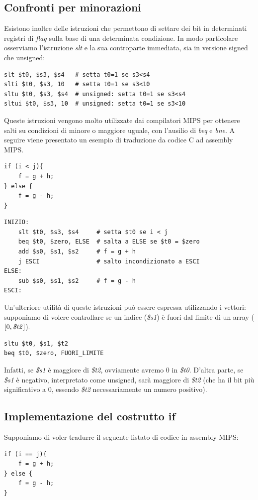 \documentclass[class=book, crop=false]{standalone}
\begin{document}
\subsection*{Confronti per minorazioni}
Esistono inoltre delle istruzioni che permettono di settare dei bit in determinati registri di \emph{flag} sulla base di una determinata condizione. In modo particolare osserviamo l'istruzione \emph{slt} e la sua controparte immediata, sia in versione signed che unsigned:
\begin{verbatim}
slt $t0, $s3, $s4   # setta t0=1 se s3<s4
slti $t0, $s3, 10   # setta t0=1 se s3<10
sltu $t0, $s3, $s4  # unsigned: setta t0=1 se s3<s4
sltui $t0, $s3, 10  # unsigned: setta t0=1 se s3<10
\end{verbatim}
Queste istruzioni vengono molto utilizzate dai compilatori MIPS per ottenere salti su condizioni di minore o maggiore uguale, con l'ausilio di \emph{beq} e \emph{bne}. A seguire viene presentato un esempio di traduzione da codice C ad assembly MIPS.
\begin{verbatim}
if (i < j){
	f = g + h;
} else {
	f = g - h;
}
\end{verbatim}
\begin{verbatim}
INIZIO:
	slt $t0, $s3, $s4     # setta $t0 se i < j
	beq $t0, $zero, ELSE  # salta a ELSE se $t0 = $zero
	add $s0, $s1, $s2     # f = g + h
	j ESCI                # salto incondizionato a ESCI
ELSE:
	sub $s0, $s1, $s2     # f = g - h
ESCI:
\end{verbatim}
Un'ulteriore utilità di queste istruzioni può essere espressa utilizzando i vettori: supponiamo di volere controllare se un indice (\emph{\$s1}) è fuori dal limite di un array (\([0, \text{\emph{\$t2}}]\)).
\begin{verbatim}
sltu $t0, $s1, $t2
beq $t0, $zero, FUORI_LIMITE
\end{verbatim}
Infatti, se \emph{\$s1} è maggiore di \emph{\$t2}, ovviamente avremo 0 in \emph{\$t0}. D'altra parte, se \emph{\$s1} è negativo, interpretato come unsigned, sarà maggiore di \emph{\$t2} (che ha il bit più significativo a 0, essendo \emph{\$t2} necessariamente un numero positivo).

\subsection*{Implementazione del costrutto if}
Supponiamo di voler tradurre il seguente listato di codice in assembly MIPS:
\begin{verbatim}
if (i == j){
	f = g + h;
} else {
	f = g - h;
}
\end{verbatim}
\end{document}

